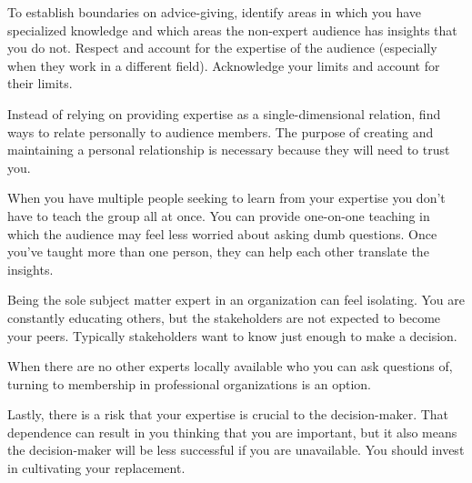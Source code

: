 To establish boundaries on advice-giving, identify areas in which you have specialized knowledge and which areas  the non-expert audience has insights that you do not.
Respect and account for the expertise of the audience (especially when they work in a different field). Acknowledge your  limits and account for their limits.

Instead of relying on providing expertise as a single-dimensional relation, find ways to relate personally to audience members. The purpose of creating and maintaining a personal relationship is necessary because they will need to trust you.


When you have multiple people seeking to learn from your expertise you don't have to teach the group all at once. You can provide one-on-one teaching in which the audience may feel less worried about asking dumb questions.
Once you've taught more than one person, they can help each other translate the insights. 


Being the sole subject matter expert in an organization can feel isolating. You are constantly educating others, but the stakeholders are not expected to become your peers. Typically stakeholders want to know just enough to make a decision. 


When there are no other experts locally available who you can ask questions of, turning to membership in professional organizations is an option.

Lastly, there is a risk that your expertise is crucial to the decision-maker. That dependence can result in you thinking that you are important, but it also means the decision-maker will be less successful if you are unavailable. You should invest in cultivating your replacement. 
